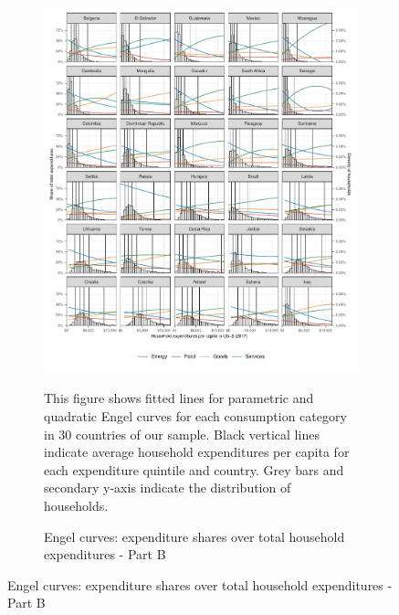 \begin{figure}[ht!]\ContinuedFloat
   \begin{subfigure}[b]{\textwidth}
  \centering
  \includegraphics{1_Figures/Analysis_Parametric_Engel_Curves/Parametric_EC_0_B.pdf}
  \caption{Engel curves: expenditure shares over total household expenditures - Part B} \label{fig:Engel_2}
  \begin{subcaption2}
    This figure shows fitted lines for parametric and quadratic Engel curves for each consumption category in 30 countries of our sample. Black vertical lines indicate average household expenditures per capita for each expenditure quintile and country. Grey bars and secondary y-axis indicate the distribution of households.
  \end{subcaption2}
\end{subfigure}
\end{figure}

\clearpage

